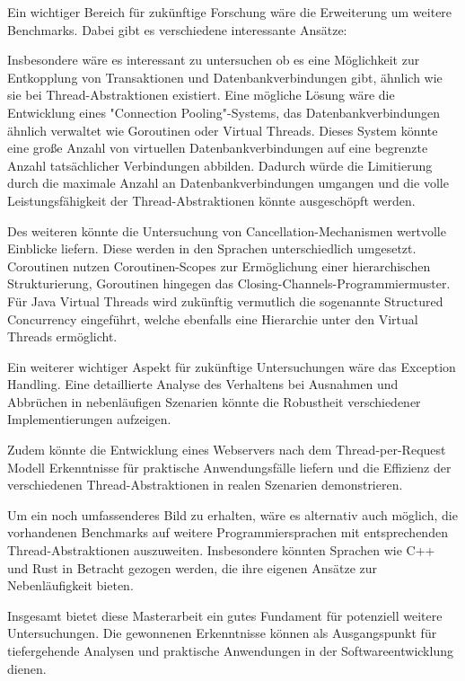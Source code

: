 \documentclass[fontsize=12pt,paper=a4,twoside=semi,parskip=half-,headsepline,headinclude]{scrreprt}
\begin{document}
Ein wichtiger Bereich für zukünftige Forschung wäre die Erweiterung um weitere Benchmarks. Dabei gibt es verschiedene interessante Ansätze:

Insbesondere wäre es interessant zu untersuchen ob es eine Möglichkeit zur Entkopplung von Transaktionen und Datenbankverbindungen gibt, ähnlich wie sie bei Thread-Abstraktionen existiert. Eine mögliche Lösung wäre die Entwicklung eines "Connection Pooling"-Systems, das Datenbankverbindungen ähnlich verwaltet wie Goroutinen oder Virtual Threads. Dieses System könnte eine große Anzahl von virtuellen Datenbankverbindungen auf eine begrenzte Anzahl tatsächlicher Verbindungen abbilden. Dadurch würde die Limitierung durch die maximale Anzahl an Datenbankverbindungen umgangen und die volle Leistungsfähigkeit der Thread-Abstraktionen könnte ausgeschöpft werden.

Des weiteren könnte die Untersuchung von Cancellation-Mechanismen wertvolle Einblicke liefern. Diese werden in den Sprachen unterschiedlich umgesetzt. Coroutinen nutzen Coroutinen-Scopes zur Ermöglichung einer hierarchischen Strukturierung, Goroutinen hingegen das Closing-Channels-Programmiermuster.
Für Java Virtual Threads wird zukünftig vermutlich die sogenannte Structured Concurrency eingeführt, welche ebenfalls eine Hierarchie unter den Virtual Threads ermöglicht.

Ein weiterer wichtiger Aspekt für zukünftige Untersuchungen wäre das Exception Handling. Eine detaillierte Analyse des Verhaltens bei Ausnahmen und Abbrüchen in nebenläufigen Szenarien könnte die Robustheit verschiedener Implementierungen aufzeigen.

Zudem könnte die Entwicklung eines Webservers nach dem Thread-per-Request Modell Erkenntnisse für praktische Anwendungsfälle liefern und die Effizienz der verschiedenen Thread-Abstraktionen in realen Szenarien demonstrieren.

Um ein noch umfassenderes Bild zu erhalten, wäre es alternativ auch möglich, die vorhandenen Benchmarks auf weitere Programmiersprachen mit entsprechenden Thread-Abs\-trak\-tio\-nen auszuweiten. Insbesondere könnten Sprachen wie C++ und Rust in Betracht gezogen werden, die ihre eigenen Ansätze zur Nebenläufigkeit bieten.

Insgesamt bietet diese Masterarbeit ein gutes Fundament für potenziell weitere Untersuchungen. Die gewonnenen Erkenntnisse können als Ausgangspunkt für tiefergehende Analysen und praktische Anwendungen in der Softwareentwicklung dienen.


\printbibliography
\end{document}
